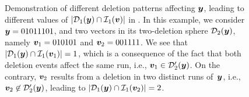 \begin{figure}[t]
\begin{center}
{
            }
	\end{center}
    \vspace{-3.3mm}
	\caption{Demonstration of different deletion patterns affecting $\bfy$, leading to different values of $|\balldel{\bfy}{1} \cap \ballins{\bfv}{1}|$ in \label{fig::intersection-sizes}. In this example, we consider $\bfy = 01011101$, and two vectors in its two-deletion sphere $\balldel{\bfy}{2}$, namely $\bfv_1=010101$ and $\bfv_2=001111$. We see that $|\balldel{\bfy}{1} \cap \ballins{\bfv_1}{1}| =1$, which is a consequence of the fact that both deletion events affect the same run, i.e., $\bfv_1 \in \balldelp{\bfy}{2}$. On the contrary, $\bfv_2$ results from a deletion in two distinct runs of~$\bfy$, i.e., $\bfv_2 \not\in \balldelp{\bfy}{2}$, leading to $|\balldel{\bfy}{1} \cap \ballins{\bfv_2}{1}| = 2$.}
    \vspace{-3.8mm}
\end{figure}